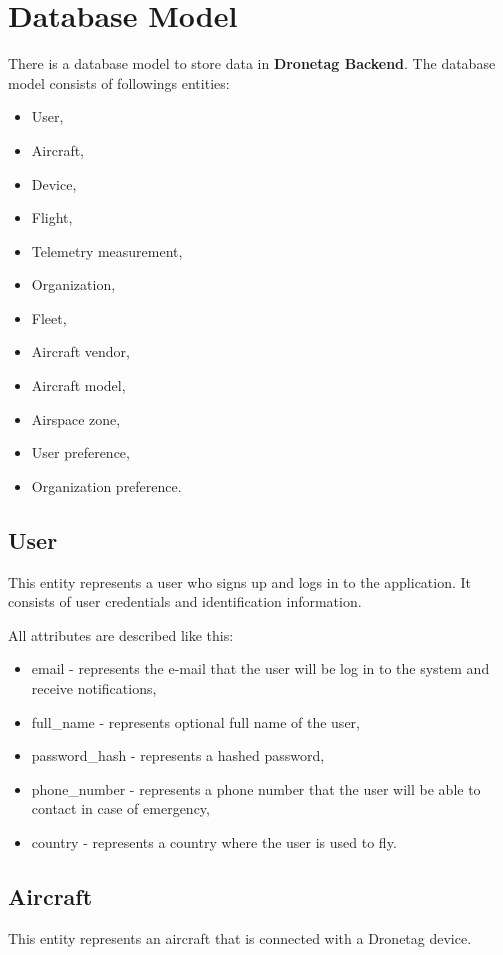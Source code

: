 \section{Database Model}\label{sec:database-model}
There is a database model to store data in \textbf{Dronetag Backend}.
The database model consists of followings entities:
\begin{itemize}
    \item User,
    \item Aircraft,
    \item Device,
    \item Flight,
    \item Telemetry measurement,
    \item Organization,
    \item Fleet,
    \item Aircraft vendor,
    \item Aircraft model,
    \item Airspace zone,
    \item User preference,
    \item Organization preference.
\end{itemize}

\subsection{User}\label{subsec:user}
This entity represents a user who signs up and logs in to the application.
It consists of user credentials and identification information.

All attributes are described like this:
\begin{itemize}
    \item email - represents the e-mail that the user will be log in to the system and receive notifications,
    \item full\_name - represents optional full name of the user,
    \item password\_hash - represents a hashed password,
    \item phone\_number - represents a phone number that the user will be able to contact in case of emergency,
    \item country - represents a country where the user is used to fly.
\end{itemize}

\subsection{Aircraft}\label{subsec:aircraft}
This entity represents an aircraft that is connected with a Dronetag device.

